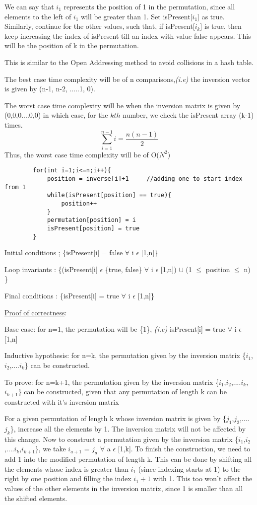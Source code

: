 \documentclass[12pt]{article}
\begin{document}
\begin{enumerate}
    We can say that $i_1$ represents the position of 1 in the permutation, since all elements to the left of $i_1$ will be greater than 1. Set isPresent[$i_1$] as true.
    Similarly, continue for the other values, such that, if isPresent[$i_k$] is true, then keep increasing the index of isPresent till an index with value false appears. This will be the position of k in the permutation.
    
    This is similar to the Open Addressing method to avoid collisions in a hash table.
    
    The best case time complexity will be of n comparisons,\textit{(i.e)} the inversion vector is given by (n-1, n-2, .....1, 0).
    
    The worst case time complexity will be when the inversion matrix is given by (0,0,0....0,0) in which case, for the $kth$ number, we check the isPresent array (k-1) times.
     \[ \sum_{i=1}^{n-1}i = \frac{n(n-1)}{2} \]
     Thus, the worst case time complexity will be of O($N^2$)
    
    
    \begin{verbatim}
        for(int i=1;i<=n;i++){
            position = inverse[i]+1     //adding one to start index from 1
            while(isPresent[position] == true){
                position++
            }
            permutation[position] = i
            isPresent[position] = true
        }
    \end{verbatim}
    Initial conditions ; \{isPresent[i] = false $\forall$ i $\epsilon$ [1,n]\}
    
    Loop invariants : \{(isPresent[i] $\epsilon$ \{true, false\} $\forall$ i $\epsilon$ [1,n]) $\cup$ (1 $\leq$ position $\leq$ n) \}
    
    Final conditions : \{isPresent[i] = true $\forall$ i $\epsilon$ [1,n]\}
    
    \underline{Proof of correctness}:
    
    Base case: for n=1, the permutation will be \{1\}, \textit{(i.e)} isPresent[i] = true $\forall$ i $\epsilon$ [1,n]
    
    Inductive hypothesis: for n=k, the permutation given by the inversion matrix \{$i_1$,$i_2$,....$i_k$\} can be constructed. 
    
    To prove: for n=k+1, the permutation given by the inversion matrix \{$i_1$,$i_2$,....$i_k$,$i_{k+1}$\} can be constructed, given that any permutation of length k can be constructed with it's inversion matrix
    
    For a given permutation of length k whose inversion matrix is given by \{$j_1$,$j_2$,....$j_k$\}, increase all the elements by 1. The inversion matrix will not be affected by this change. Now to construct a permutation given by the inversion matrix \{$i_1$,$i_2$,....$i_k$,$i_{k+1}$\}, we take $i_{a+1}$ = $j_a$ $\forall$ a $\epsilon$ [1,k]. To finish the construction, we need to add 1 into the modified permutation of length k. This can be done by shifting all the elements whose index is greater than $i_1$ (since indexing starts at 1) to the right by one position and filling the index $i_1+1$ with 1. This too won't affect the values of the other elements in the inversion matrix, since 1 is smaller than all the shifted elements.
    

\end{enumerate}
\end{document}
